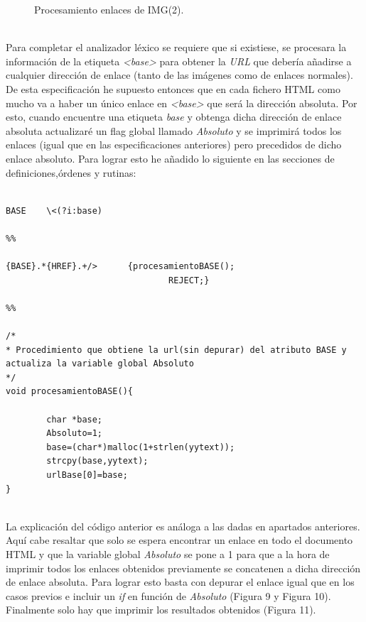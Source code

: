 \documentclass[10pt, a4paper,spanish]{article}
\begin{document}
\begin{figure}[H]
  \centering
  \caption{Procesamiento enlaces de IMG(2).}
\end{figure}


\noindent \\ Para completar el analizador léxico se requiere que si existiese, se procesara la información de la etiqueta \textit{<base>} para obtener la \textit{URL} que debería
añadirse a cualquier dirección de enlace (tanto de las imágenes como de enlaces normales). De esta especificación he supuesto entonces que en cada fichero HTML como mucho va a haber un único enlace en \textit{<base>} que será la dirección absoluta. Por esto, cuando encuentre una etiqueta \textit{base} y obtenga dicha dirección de enlace absoluta actualizaré un flag global llamado \textit{Absoluto} y se imprimirá todos los enlaces (igual que en las especificaciones anteriores) pero precedidos de dicho enlace absoluto. Para lograr esto he añadido lo siguiente en las secciones de definiciones,órdenes y rutinas:
\newpage
\begin{lstlisting}

BASE    \<(?i:base)

%%

{BASE}.*{HREF}.+/>      {procesamientoBASE();
                                REJECT;}

%%

/*
* Procedimiento que obtiene la url(sin depurar) del atributo BASE y actualiza la variable global Absoluto
*/
void procesamientoBASE(){

        char *base;
        Absoluto=1;
        base=(char*)malloc(1+strlen(yytext));
        strcpy(base,yytext);
        urlBase[0]=base;
}

\end{lstlisting}

\noindent \\ La explicación del código anterior es análoga a las dadas en apartados anteriores. Aquí cabe resaltar que solo se espera encontrar un enlace en todo el documento HTML y que la variable global \textit{Absoluto} se pone a 1 para que a la hora de imprimir todos los enlaces obtenidos previamente se concatenen a dicha dirección de enlace absoluta. Para lograr esto basta con depurar el enlace igual que en los casos previos e incluir un \textit{if} en función de \textit{Absoluto} (Figura 9 y Figura 10). Finalmente solo hay que imprimir los resultados obtenidos (Figura 11).
\end{document}
